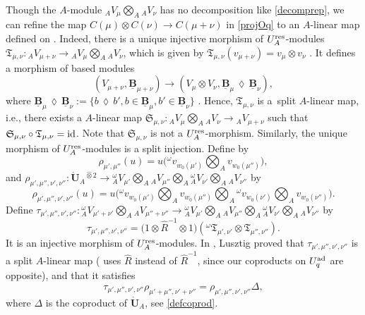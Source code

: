 \documentclass[10pt,a4paper]{amsart}
\numberwithin{equation}{section}
\theoremstyle{definition}
\newcommand{\ra}{\rightarrow}
\newcommand{\smallbullet}{%
\vcenter{\hbox{\,\scalebox{0.5}{$\bullet$}\,}}
}
\begin{document}
Though the $A$-module ${}_AV_\mu \bigotimes_A {}_AV_\nu$ has no decomposition like \eqref{decomprep}, we can refine the map $C(\mu) \otimes C(\nu) \ra C(\mu+\nu)$ in \eqref{projOq} to an $A$-linear map defined on \smash{${}_A \overset{\raisebox{-1.5pt}{\scriptsize$\smallbullet$}}{C} (\mu) \bigotimes_A {}_A \overset{\raisebox{-1.5pt}{\scriptsize$\smallbullet$}}{C} (\nu)$}. Indeed, there is a unique injective morphism of $U_A^{\rm res}$-modules $\mathfrak{T}_{\mu,\nu}\colon{}_AV_{\mu+\nu}\ra {}_AV_\mu \bigotimes_A {}_AV_\nu$, which is given by $\mathfrak{T}_{\mu,\nu}(v_{\mu+\nu}) = v_{\mu} \otimes v_{\nu}$ \cite[Proposition 25.1.2\,(a)--(b)]{Lusztig}. It defines a morphism of based modules
\[(V_{\mu+\nu},\underline{\mathbf{B}}_{\mu+\nu}) \ra (V_\mu \otimes V_\nu ,\underline{\mathbf{B}}_{\mu} \,\lozenge\, \underline{\mathbf{B}}_\nu),
\]
where $\underline{\mathbf{B}}_{\mu} \,\lozenge\, \underline{\mathbf{B}}_\nu := \{b\,\lozenge\, b', b\in \underline{\mathbf{B}}_{\mu}, b'\in \underline{\mathbf{B}}_{\nu} \}$ \cite[Proposition~27.1.7]{Lusztig}. Hence, $\mathfrak{T}_{\mu,\nu}$ is a~split $A$-li\-near map, i.e., there exists a $A$-linear map $\mathfrak{S}_{\mu,\nu}\colon {}_AV_\mu \bigotimes_A {}_AV_\nu \ra {}_AV_{\mu+\nu} $ such that ${\mathfrak{S}_{\mu,\nu}\circ \mathfrak{T}_{\mu,\nu} ={\rm id}}$. Note that $\mathfrak{S}_{\mu,\nu}$ is not a $U_A^{\rm res}$-morphism. Similarly, the unique morphism of $U_A^{\rm res}$-modules \smash{${}^\omega\mathfrak{T}_{\mu,\nu}\colon{}_A^\omega V_{\mu+\nu}\ra {}_A^\omega V_\mu \bigotimes_A {}_A^\omega V_\nu$} is a split injection. Define \smash{$\rho_{\mu',\mu''}\colon \dot{\mathbf{U}}_A \ra {}_A^\omega V_{\mu'} \bigotimes_A {}_AV_{\mu''}$} by
\[
\rho_{\mu',\mu''}(u)= u\biggl({}^\omega v_{w_0(\mu')}\bigotimes_A v_{w_0(\mu'')}\biggr),\]
and $\rho_{\mu',\mu'',\nu',\nu''}\colon \dot{\mathbf{U}}_A{}^{ \hat{\otimes}2} \ra {}_A^\omega V_{\mu'} \bigotimes_A {}_AV_{\mu''} \bigotimes_A {}_A^\omega V_{\nu'} \bigotimes_A {}_AV_{\nu''}$ by
\[\rho_{\mu',\mu'',\nu',\nu''}(u)= u\biggl({}^\omega v_{w_0(\mu')}\bigotimes_A v_{w_0(\mu'')}\bigotimes_A {}^\omega v_{w_0(\nu')}\bigotimes_A v_{w_0(\nu'')}\biggr).\]
Define $\tau_{\mu',\mu'',\nu',\nu''}\colon {}_A^\omega V_{\mu'+\nu'} \bigotimes_A {}_AV_{\mu''+\nu''} \ra {}_A^\omega V_{\mu'} \bigotimes_A {}_AV_{\mu''} \bigotimes_A {}_A^\omega V_{\nu'} \bigotimes_A {}_AV_{\nu''}$ by
\[\tau_{\mu',\mu'',\nu',\nu''} = \big(1\otimes \hat{R}^{-1} \otimes 1\big)({}^\omega \mathfrak{T}_{\mu',\nu'} \otimes \mathfrak{T}_{\mu'',\nu''}).\]
It is an injective morphism of $U_A^{\rm res}$-modules. In \cite[Section 1.13]{Lusztig3}, Lusztig proved that $\tau_{\mu',\mu'',\nu',\nu''}$ is a split $A$-linear map (\cite{Lusztig3} uses $\hat{R}$ instead of $\hat{R}^{-1}$, since our coproducts on $U_q^{\rm ad}$ are opposite), and that it satisfies{\samepage
\begin{equation}\label{commutdiagLusztig}
\tau_{\mu',\mu'',\nu',\nu''} \rho_{\mu'+\mu'',\nu'+\nu''} = \rho_{\mu',\mu'',\nu',\nu''}\Delta,
\end{equation}
where $\Delta$ is the coproduct of $\dot{\mathbf{U}}_A$, see \eqref{defcoprod}.}
\end{document}

